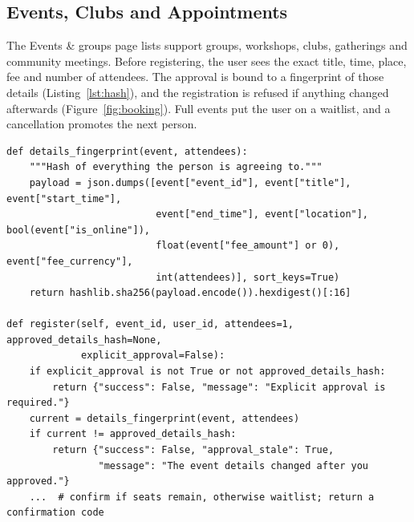 \documentclass[11pt,a4paper]{article}
\newcommand{\code}[1]{\texttt{#1}}
\begin{document}
\subsection{Events, Clubs and Appointments}
The Events \& groups page lists support groups, workshops, clubs, gatherings and community
meetings. Before registering, the user sees the exact title, time, place, fee and number of
attendees. The approval is bound to a fingerprint of those details (Listing~\ref{lst:hash}), and the
registration is refused if anything changed afterwards (Figure~\ref{fig:booking}). Full events put the
user on a waitlist, and a cancellation promotes the next person.

\par\noindent\begin{minipage}{\linewidth}\begin{lstlisting}[caption={Approval is bound to a fingerprint of everything the person agreed to (\code{agent/tools/events\_db.py}, shortened).},label={lst:hash}]
def details_fingerprint(event, attendees):
    """Hash of everything the person is agreeing to."""
    payload = json.dumps([event["event_id"], event["title"], event["start_time"],
                          event["end_time"], event["location"], bool(event["is_online"]),
                          float(event["fee_amount"] or 0), event["fee_currency"],
                          int(attendees)], sort_keys=True)
    return hashlib.sha256(payload.encode()).hexdigest()[:16]

def register(self, event_id, user_id, attendees=1, approved_details_hash=None,
             explicit_approval=False):
    if explicit_approval is not True or not approved_details_hash:
        return {"success": False, "message": "Explicit approval is required."}
    current = details_fingerprint(event, attendees)
    if current != approved_details_hash:
        return {"success": False, "approval_stale": True,
                "message": "The event details changed after you approved."}
    ...  # confirm if seats remain, otherwise waitlist; return a confirmation code
\end{lstlisting}\end{minipage}\par
\end{document}
